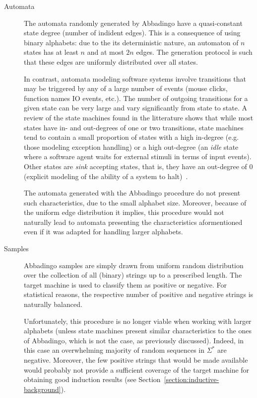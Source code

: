 \begin{description}
\item[Automata] The automata randomly generated by Abbadingo have a quasi-constant state degree (number of indident edges). This is a consequence of using binary alphabets: due to the its deterministic nature, an automaton of $n$ states has at least $n$ and at most $2n$ edges. The generation protocol is such that these edges are uniformly distributed over all states. 

In contrast, automata modeling software systems involve transitions that may be triggered by any of a large number of events (mouse clicks, function names IO events, etc.). The number of outgoing transitions for a given state can be very large and vary significantly from state to state. A review of the state machines found in the litterature shows that while most states have in- and out-degrees of one or two transitions, state machines tend to contain a small proportion of states with a high in-degree (e.g. those modeling exception handling) or a high out-degree (an \emph{idle} state where a software agent waits for external stimuli in terms of input events). Other states are \emph{sink} accepting states, that is, they have an out-degree of 0 (explicit modeling of the ability of a system to halt)~\cite{Walkinshaw:2008}.

The automata generated with the Abbadingo procedure do not present such characteristics, due to the small alphabet size. Moreover, because of the uniform edge distribution it implies, this procedure would not naturally lead to automata presenting the characteristics aformentioned even if it was adapted for handling larger alphabets.

\item[Samples] Abbadingo samples are simply drawn from uniform random distribution over the collection of all (binary) strings up to a prescribed length. The target machine is used to classify them as positive or negative. For statistical reasons, the respective number of positive and negative strings is naturally balanced.

Unfortunately, this procedure is no longer viable when working with larger alphabets (unless state machines present similar characteristics to the ones of Abbadingo, which is not the case, as previously discussed). Indeed, in this case an overwhelming majority of random sequences in $\Sigma^*$ are negative. Moreover, the few positive strings that would be made available would probably not provide a sufficient coverage of the target machine for obtaining good induction results (see Section~\ref{section:inductive-background}).


\end{description}
